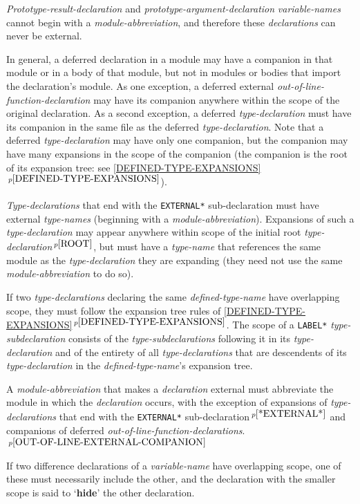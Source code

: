 \documentclass[12pt]{article}
\newcommand{\key}[1]{{\rm \bfseries #1}}
\newcommand{\itemref}[1]{\ref{#1}$\,^{p\pageref{#1}}$}
\newcommand{\pagnote}[1]{$\,^{p\pageref{#1}}$}
\begin{document}
{\em Prototype-result-declaration} and {\em prototype-argument-declaration}
{\em variable-names} cannot begin with a {\em module-abbreviation},
and therefore these {\em declarations} can never be external.

In general, a deferred declaration
in a module may have a companion in that module
or in a body of that module, but not in modules or bodies that import
the declaration's module.
As one exception, a deferred external {\em out-of-line-function-declaration}
may have its companion
anywhere within the scope of the original declaration.
As a second exception, a deferred {\em type-declaration} must have its
companion in the same file as the deferred {\em type-declaration}.
Note that a deferred {\em type-declaration} may have only one
companion, but the companion may have many expansions in the
scope of the companion (the companion is the root of its expansion tree:
see \itemref{DEFINED-TYPE-EXPANSIONS}).

{\em Type-declarations} that end with the {\tt *EXTERNAL*}
sub-declaration must have external {\em type-names}
(beginning with a {\em module-abbreviation}).
Expansions of such a {\em type-declaration} may appear
anywhere within scope of the initial root {\em type-declaration}\pagnote{ROOT},
but must have a {\em type-name} that references the same module
as the {\em type-declaration} they are expanding (they need not use the same
{\em module-abbreviation} to do so).

If two {\em type-declarations} declaring the same {\em defined-type-name}
have overlapping scope, they must follow the expansion tree rules
of \itemref{DEFINED-TYPE-EXPANSIONS}.
The scope of a {\tt *LABEL*} {\em type-subdeclaration}
consists of the {\em type-subdeclarations} following it in its
{\em type-declaration} and of the entirety of all
{\em type-declarations} that are descendents
of its {\em type-declaration} in the {\em defined-type-name}'s
expansion tree.

A {\em module-abbreviation} that makes a {\em declaration} external
must abbreviate the module in which the {\em declaration} occurs,
with the exception of expansions of {\em type-declar\-ations}
that end with the {\tt *EXTERNAL*} sub-declaration\pagnote{*EXTERNAL*}
and companions of deferred
{\em out-of-line-function-declarations}.\pagnote{OUT-OF-LINE-EXTERNAL-COMPANION}

If two difference declarations of a {\em variable-name} have overlapping
scope, one of these must necessarily include the other,
and the declaration with the smaller scope is said to
`\key{hide}'\label{HIDE} the other declaration.
\end{document}

